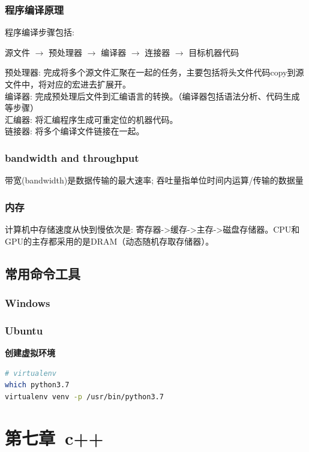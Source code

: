 \documentclass[12pt]{book}
\begin{document}
\subsection{程序编译原理}
程序编译步骤包括:
 \begin{center} 源文件 $\rightarrow$ 预处理器 $\rightarrow$ 编译器 $\rightarrow$ 连接器 $\rightarrow$ 目标机器代码 \end{center}
预处理器: 完成将多个源文件汇聚在一起的任务，主要包括将头文件代码copy到源文件中，将对应的宏进去扩展开。\\
编译器: 完成预处理后文件到汇编语言的转换。（编译器包括语法分析、代码生成等步骤）\\
汇编器: 将汇编程序生成可重定位的机器代码。\\
链接器: 将多个编译文件链接在一起。\\
\subsection{bandwidth and throughput}
带宽(bandwidth)是数据传输的最大速率;
吞吐量指单位时间内运算/传输的数据量

\subsection{内存}
计算机中存储速度从快到慢依次是: 寄存器->缓存->主存->磁盘存储器。CPU和GPU的主存都采用的是DRAM（动态随机存取存储器）。

\section{常用命令工具}
\subsection{Windows}
\subsection{Ubuntu}
\textbf{创建虚拟环境}
\begin{lstlisting}[language=bash]
# virtualenv
which python3.7
virtualenv venv -p /usr/bin/python3.7
\end{lstlisting}

\newpage

\fancyhead{}

\chapter{第七章\ c++}
\end{document}
